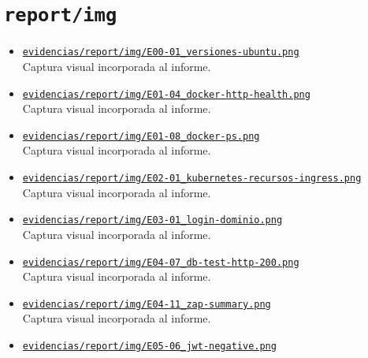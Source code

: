 \section{\texorpdfstring{\nolinkurl{report/img}}{report/img}}
\begin{itemize}[leftmargin=1.2em]
  \item \href{https://github.com/gamurigm/inventrack-ptes-report/blob/main/evidencias/report/img/E00-01_versiones-ubuntu.png}{\nolinkurl{evidencias/report/img/E00-01_versiones-ubuntu.png}}\\
  {\small Captura visual incorporada al informe.}
  \item \href{https://github.com/gamurigm/inventrack-ptes-report/blob/main/evidencias/report/img/E01-04_docker-http-health.png}{\nolinkurl{evidencias/report/img/E01-04_docker-http-health.png}}\\
  {\small Captura visual incorporada al informe.}
  \item \href{https://github.com/gamurigm/inventrack-ptes-report/blob/main/evidencias/report/img/E01-08_docker-ps.png}{\nolinkurl{evidencias/report/img/E01-08_docker-ps.png}}\\
  {\small Captura visual incorporada al informe.}
  \item \href{https://github.com/gamurigm/inventrack-ptes-report/blob/main/evidencias/report/img/E02-01_kubernetes-recursos-ingress.png}{\nolinkurl{evidencias/report/img/E02-01_kubernetes-recursos-ingress.png}}\\
  {\small Captura visual incorporada al informe.}
  \item \href{https://github.com/gamurigm/inventrack-ptes-report/blob/main/evidencias/report/img/E03-01_login-dominio.png}{\nolinkurl{evidencias/report/img/E03-01_login-dominio.png}}\\
  {\small Captura visual incorporada al informe.}
  \item \href{https://github.com/gamurigm/inventrack-ptes-report/blob/main/evidencias/report/img/E04-07_db-test-http-200.png}{\nolinkurl{evidencias/report/img/E04-07_db-test-http-200.png}}\\
  {\small Captura visual incorporada al informe.}
  \item \href{https://github.com/gamurigm/inventrack-ptes-report/blob/main/evidencias/report/img/E04-11_zap-summary.png}{\nolinkurl{evidencias/report/img/E04-11_zap-summary.png}}\\
  {\small Captura visual incorporada al informe.}
  \item \href{https://github.com/gamurigm/inventrack-ptes-report/blob/main/evidencias/report/img/E05-06_jwt-negative.png}{\nolinkurl{evidencias/report/img/E05-06_jwt-negative.png}}\\

\end{itemize}
